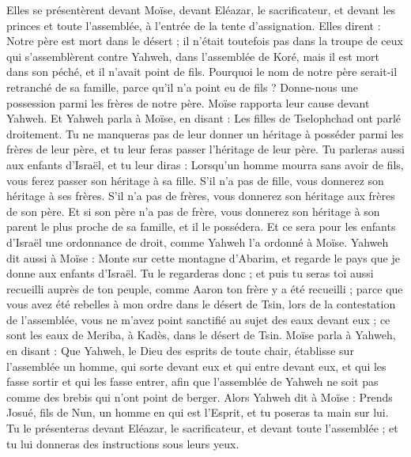 \begin{multicols}{2}
Elles se présentèrent devant Moïse, devant Eléazar, le sacrificateur, et devant les princes et toute l'assemblée, à l'entrée de la tente d'assignation. Elles dirent :
Notre père est mort dans le désert ; il n'était toutefois pas dans la troupe de ceux qui s'assemblèrent contre Yahweh, dans l'assemblée de Koré, mais il est mort dans son péché, et il n'avait point de fils.
Pourquoi le nom de notre père serait-il retranché de sa famille, parce qu'il n'a point eu de fils ? Donne-nous une possession parmi les frères de notre père.
Moïse rapporta leur cause devant Yahweh.
Et Yahweh parla à Moïse, en disant :
Les filles de Tselophchad ont parlé droitement. Tu ne manqueras pas de leur donner un héritage à posséder parmi les frères de leur père, et tu leur feras passer l'héritage de leur père.
Tu parleras aussi aux enfants d'Israël, et tu leur diras : Lorsqu'un homme mourra sans avoir de fils, vous ferez passer son héritage à sa fille.
S'il n'a pas de fille, vous donnerez son héritage à ses frères.
S'il n'a pas de frères, vous donnerez son héritage aux frères de son père.
Et si son père n'a pas de frère, vous donnerez son héritage à son parent le plus proche de sa famille, et il le possédera. Et ce sera pour les enfants d'Israël une ordonnance de droit, comme Yahweh l'a ordonné à Moïse.
Yahweh dit aussi à Moïse : Monte sur cette montagne d'Abarim, et regarde le pays que je donne aux enfants d'Israël.
Tu le regarderas donc ; et puis tu seras toi aussi recueilli auprès de ton peuple, comme Aaron ton frère y a été recueilli ;
parce que vous avez été rebelles à mon ordre dans le désert de Tsin, lors de la contestation de l'assemblée, vous ne m'avez point sanctifié au sujet des eaux devant eux ; ce sont les eaux de Meriba, à Kadès, dans le désert de Tsin.
Moïse parla à Yahweh, en disant :
Que Yahweh, le Dieu des esprits de toute chair, établisse sur l'assemblée un homme,
qui sorte devant eux et qui entre devant eux, et qui les fasse sortir et qui les fasse entrer, afin que l'assemblée de Yahweh ne soit pas comme des brebis qui n'ont point de berger.
Alors Yahweh dit à Moïse : Prends Josué, fils de Nun, un homme en qui est l'Esprit, et tu poseras ta main sur lui.
Tu le présenteras devant Eléazar, le sacrificateur, et devant toute l'assemblée ; et tu lui donneras des instructions sous leurs yeux.

\end{multicols}
